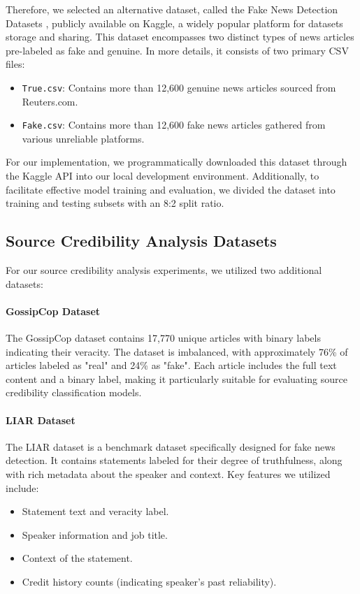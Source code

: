 \documentclass[11pt,a4paper]{article}
\begin{document}
Therefore, we selected an alternative dataset, called the Fake News Detection Datasets \cite{ahmed2018detecting, ahmed2017detection}, publicly available on Kaggle, a widely popular platform for datasets storage and sharing. This dataset encompasses two distinct types of news articles pre-labeled as fake and genuine. In more details, it consists of two primary CSV files:

\begin{itemize}
    \item \texttt{True.csv}: Contains more than 12,600 genuine news articles sourced from Reuters.com.
    \item \texttt{Fake.csv}: Contains more than 12,600 fake news articles gathered from various unreliable platforms.
\end{itemize}

For our implementation, we programmatically downloaded this dataset through the Kaggle API into our local development environment. Additionally, to facilitate effective model training and evaluation, we divided the dataset into training and testing subsets with an 8:2 split ratio.

\subsection{Source Credibility Analysis Datasets}
For our source credibility analysis experiments, we utilized two additional datasets:

\paragraph{GossipCop Dataset} \cite{gossipcop_dataset}
The GossipCop dataset contains 17,770 unique articles with binary labels indicating their veracity. The dataset is imbalanced, with approximately 76\% of articles labeled as "real" and 24\% as "fake". Each article includes the full text content and a binary label, making it particularly suitable for evaluating source credibility classification models.

\paragraph{LIAR Dataset} \cite{liar_dataset}
The LIAR dataset is a benchmark dataset specifically designed for fake news detection. It contains statements labeled for their degree of truthfulness, along with rich metadata about the speaker and context. Key features we utilized include:
\begin{itemize}
    \item Statement text and veracity label.
    \item Speaker information and job title.
    \item Context of the statement.
    \item Credit history counts (indicating speaker's past reliability).
\end{itemize}
\end{document}
